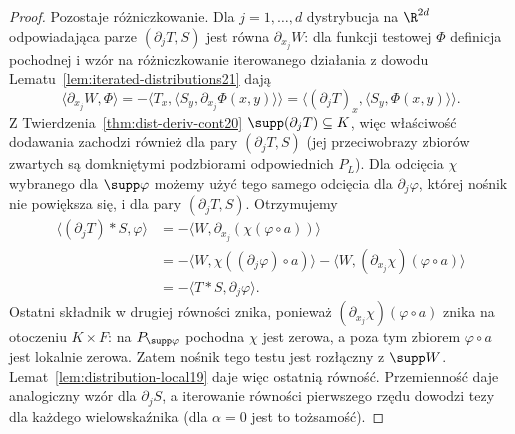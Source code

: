 \begin{proof}
Pozostaje różniczkowanie. Dla $j=1,\ldots,d$
dystrybucja na $\R^{2d}$ odpowiadająca parze
$(\partial_jT,S)$ jest równa $\partial_{x_j}W$:
dla funkcji testowej $\Phi$ definicja pochodnej
i wzór na różniczkowanie iterowanego działania
z dowodu Lematu~\ref{lem:iterated-distributions21}
dają
\[
 \langle\partial_{x_j}W,\Phi\rangle
 =-\langle T_x,\langle S_y,\partial_{x_j}\Phi(x,y)\rangle\rangle
 =\langle(\partial_jT)_x,\langle S_y,\Phi(x,y)\rangle\rangle.
\]
Z Twierdzenia~\ref{thm:dist-deriv-cont20}
$\supp(\partial_jT)\subseteq K$, więc właściwość
dodawania zachodzi również dla pary $(\partial_jT,S)$
(jej przeciwobrazy zbiorów zwartych są domkniętymi
podzbiorami odpowiednich $P_L$).
Dla odcięcia $\chi$ wybranego dla $\supp\varphi$
możemy użyć tego samego odcięcia dla $\partial_j\varphi$,
której nośnik nie powiększa się, i dla pary
$(\partial_jT,S)$. Otrzymujemy
\[
\begin{aligned}
 \langle(\partial_jT)*S,\varphi\rangle
 &=-\langle W,\partial_{x_j}(\chi(\varphi\circ a))\rangle\\
 &=-\langle W,\chi((\partial_j\varphi)\circ a)\rangle
   -\langle W,(\partial_{x_j}\chi)(\varphi\circ a)\rangle\\
 &=-\langle T*S,\partial_j\varphi\rangle.
\end{aligned}
\]
Ostatni składnik w drugiej równości znika, ponieważ
$(\partial_{x_j}\chi)(\varphi\circ a)$ znika
na otoczeniu $K\times F$: na $P_{\supp\varphi}$
pochodna $\chi$ jest zerowa, a poza tym zbiorem
$\varphi\circ a$ jest lokalnie zerowa.
Zatem nośnik tego testu jest rozłączny z $\supp W$.
Lemat~\ref{lem:distribution-local19} daje więc ostatnią
równość.
Przemienność daje analogiczny wzór dla $\partial_j S$,
a iterowanie równości pierwszego rzędu dowodzi tezy
dla każdego wielowskaźnika (dla $\alpha=0$ jest to
tożsamość).
\end{proof}

